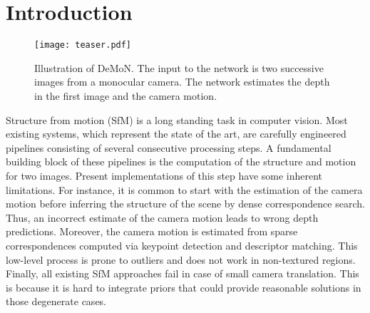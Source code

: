 \documentclass[10pt,twocolumn,letterpaper]{article}
\begin{document}
\section{Introduction}

\begin{figure}
\begin{center}
  \texttt{[image: teaser.pdf]}
\end{center}
\vspace{\capvspace}%
\caption{%
Illustration of DeMoN. The input to the network is two successive images from a monocular camera. The network estimates the depth in the first image and the camera motion.
}
\label{fig:teaser}
\vspace{\figvspace}
\end{figure}


Structure from motion (SfM) is a long standing task in computer vision. 
Most existing systems, which represent the state of the art, are carefully engineered pipelines consisting of several consecutive processing steps.
A fundamental building block of these pipelines is the computation of the structure and motion for two images. 
Present implementations of this step have some inherent limitations. %
For instance, it is common to start with the estimation of the camera motion before inferring the structure of the scene by dense correspondence search. 
Thus, an incorrect estimate of the camera motion leads to wrong depth predictions. 
Moreover, the camera motion is estimated from sparse correspondences computed via keypoint detection and descriptor matching. 
This low-level process is prone to outliers and does not work in non-textured regions. 
Finally, all existing SfM approaches fail in case of small camera translation. 
This is because it is hard to integrate priors that could provide reasonable solutions in those degenerate cases.
\end{document}
